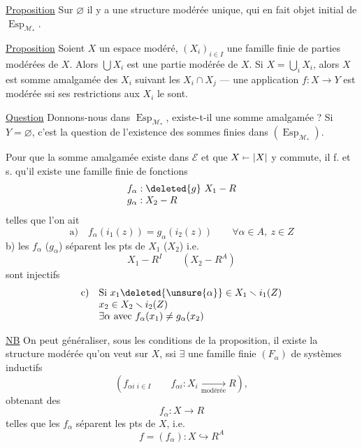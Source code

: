 \uline{Proposition} Sur $\varnothing$ il y a une structure modérée unique, qui en fait objet initial de $\operatorname{Esp}_{\mathcal M_*}$.

\uline{Proposition} Soient $X$ un espace modéré, $(X_i)_{i\in I}$ une famille finie de parties modérées de $X$. Alors $\bigcup X_i$ est une partie modérée de $X$. Si $X=\bigcup_iX_i$, alors $X$ est somme amalgamée des $X_i$ suivant les $X_i\cap X_j$ --- une application $f:X\longrightarrow Y$  est modérée ssi ses restrictions aux $X_i$ le sont.

\uline{Question} Donnons-nous
dans $\operatorname{Esp}_{\mathcal M_*}$, existe-t-il une somme amalgamée ? Si $Y=\varnothing$, c'est la question de l'existence des sommes finies dans $(\operatorname{Esp}_{\mathcal M_*})$.

Pour que la somme amalgamée existe dans  $\mathcal E$ et que $X\mathrel{\mapstochar\relbar}|X|$ y commute, il f. et s. qu'il existe une famille finie de  fonctions
\[
\begin{array}{l}
f_\alpha:\deleted{g}\ X_1\mathbin{-}R\\
g_\alpha:X_2\mathbin{-}R
\end{array}
\]
telles que l'on ait
\[
\text{a)}\quad f_\alpha(i_1(z))=g_\alpha(i_2(z))\qquad\forall\alpha\in A,\ z\in Z
\]
b)  les $f_\alpha$ ($g_\alpha$) séparent les pts de $X_1$ ($X_2$) i.e.
\[
 X_1\mathbin{-}R^I\qquad(X_2\mathbin{-}R^A)
\]
sont injectifs
\[
\begin{array}{ll}
\text{c)}&\text{Si }x_1\deleted{\unsure{\alpha}}\in X_1\smallsetminus i_1(Z)\\
&x_2\in X_2\smallsetminus i_2(Z)\\
&\exists\alpha\text{ avec }f_\alpha(x_1)\ne g_\alpha(x_2)
\end{array}
\]

\uline{NB} On peut généraliser, sous les conditions de la proposition, il existe la structure modérée qu'on veut sur $X$, ssi $\exists$ une famille finie $(F_\alpha)$  de systèmes inductifs
\[
 (f_{\alpha i}\,{}_{i\in I}\qquad f_{\alpha i}:X_i\underset{\text{modérée}}{\longrightarrow}R),
\]
obtenant des
\[
 f_\alpha:X\longrightarrow R
\]
telles que les $f_\alpha$ séparent les pts de $X$, i.e.
\[
 f=(f_\alpha):X\hookrightarrow R^A
\]

